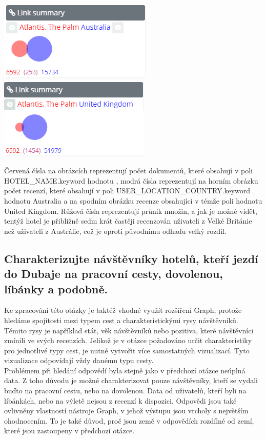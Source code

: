 \documentclass[czech,BP]{thesiskiv}
\begin{document}
\begin{center}
	\includegraphics[scale=0.85]{img/AUS_atlantis.PNG}
	\hspace{0.4cm}
	\includegraphics[scale=0.85]{img/UK_atlantis.PNG}
\end{center}
 	
Červená čísla na obrázcích reprezentují počet dokumentů, které obsahují v poli HOTEL\_NAME.keyword hodnotu , modrá čísla reprezentují na horním obrázku počet recenzí, které obsahují v poli USER\_LOCATION\_COUNTRY.keyword hodnotu Australia a na spodním obrázku recenze obsahující v témže poli hodnotu United Kingdom. Růžová čísla reprezentují průnik množin, a jak je možné vidět, tentýž hotel je přibližně sedm krát častěji recenzován uživateli z Velké Británie než uživateli z Austrálie, což je oproti původnímu odhadu velký rozdíl.

\subsection{Charakterizujte návštěvníky hotelů, kteří jezdí do Dubaje na pracovní cesty, dovolenou, líbánky a podobně.}
Ke zpracování této otázky je taktéž vhodné využít rozšíření Graph, protože hledáme spojitosti mezi typem cest a charakteristickými rysy návštěvníků. Těmito rysy je například stát, věk návštěvníků nebo pozitiva, které návštěvníci zmínili ve svých recenzích. Jelikož je v otázce požadováno určit charakteristiky pro jednotlivé typy cest, je nutné vytvořit více samostatných vizualizací. Tyto vizualizace odpovídají vždy danému typu cesty.
\\
Problémem při hledání odpovědí byla stejně jako v předchozí otázce neúplná data. Z toho důvodu je možné charakterizovat pouze návštěvníky, kteří se vydali buďto na pracovní cestu, nebo na dovolenou. Data od uživatelů, kteří byli na líbánkách, nebo na výletě nejsou z recenzí k dispozici. Odpovědi jsou také ovlivněny vlastností nástroje Graph, v jehož výstupu jsou vrcholy s největším ohodnocením. To je také důvod, proč jsou země v odpovědích rozdílné od zemí, které jsou zastoupeny v předchozí otázce.
\end{document}

